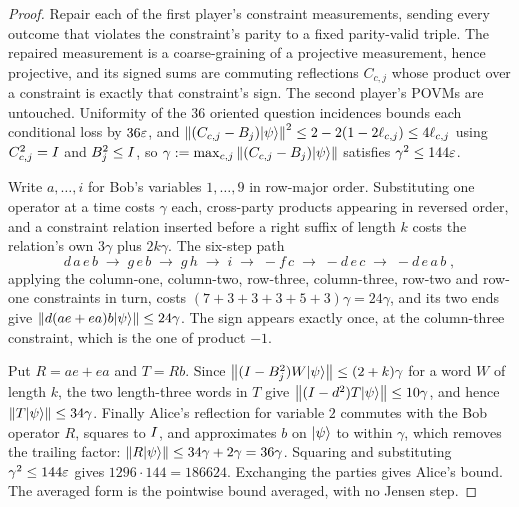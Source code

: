 \begin{proof}
\leanok
{}
Repair each of the first player's constraint measurements, sending every outcome that violates the
constraint's parity to a fixed parity-valid triple. The repaired measurement is a coarse-graining
of a projective measurement, hence projective, and its signed sums are commuting reflections
$C_{c,j}$ whose product over a constraint is exactly that constraint's sign. The second player's
POVMs are untouched. Uniformity of the $36$ oriented question incidences bounds each
conditional loss by $36\varepsilon$, and
$\left\| {(C_{c,j} - B_j)|\psi\rangle} \right\|^2 \leq 2 - 2(1 - 2\ell_{c,j}) \leq 4 \ell_{c,j}$ using
$C_{c,j}^2 = I$ and $B_j^2 \leq I$, so $\gamma := \max_{c,j} \left\| {(C_{c,j} -
B_j)|\psi\rangle} \right\|$ satisfies $\gamma^2 \leq 144 \varepsilon$.

Write $a, \dots, i$ for Bob's variables $1, \dots, 9$ in row-major order. Substituting one
operator at a time costs $\gamma$ each, cross-party products appearing in reversed order, and
a constraint relation inserted before a right suffix of length $k$ costs the relation's own
$3\gamma$ plus $2k\gamma$. The six-step path
\begin{equation*}
  d\,a\,e\,b \;\to\; g\,e\,b \;\to\; g\,h \;\to\; i \;\to\; -f\,c
  \;\to\; -d\,e\,c \;\to\; -d\,e\,a\,b\;,
\end{equation*}
applying the column-one, column-two, row-three, column-three, row-two and row-one
constraints in turn, costs $(7 + 3 + 3 + 3 + 5 + 3)\gamma = 24\gamma$, and its two ends give
$\left\| { d (ae + ea) b |\psi\rangle } \right\| \leq 24 \gamma$. The sign appears exactly once, at the
column-three constraint, which is the one of product $-1$.

Put $R = ae + ea$ and $T = Rb$. Since $\left\| {(I - B_j^2) W |\psi\rangle} \right\| \leq (2 + k)\gamma$
for a word $W$ of length $k$, the two length-three words in $T$ give
$\left\| {(I - d^2) T |\psi\rangle} \right\| \leq 10\gamma$, and hence $\left\| {T|\psi\rangle} \right\| \leq 34\gamma$.
Finally Alice's reflection for variable $2$ commutes with the Bob operator $R$, squares to
$I$, and approximates $b$ on $|\psi\rangle$ to within $\gamma$, which removes the trailing
factor: $\left\| {R |\psi\rangle} \right\| \leq 34\gamma + 2\gamma = 36\gamma$. Squaring and substituting
$\gamma^2 \leq 144\varepsilon$ gives $1296 \cdot 144 = 186624$. Exchanging the parties gives Alice's
bound. The averaged form is the pointwise bound averaged, with no Jensen step.
\end{proof}

